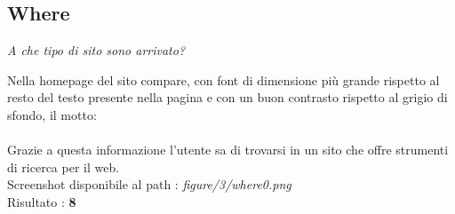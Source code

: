 \subsection{Where}
\begin{center}

\textit{A che tipo di sito sono arrivato?}

\end{center}
\begin{flushleft}
Nella homepage del sito compare, con font  di dimensione
più grande rispetto al resto del testo presente nella pagina e con un buon
contrasto rispetto al grigio di sfondo, il motto: \\
 \\
Grazie a questa informazione l'utente sa di trovarsi in un sito che offre
strumenti di ricerca per il web. \\
Screenshot disponibile al path : \textit{figure/3/where0.png} \\
Risultato : \textbf{8}
\end{flushleft}